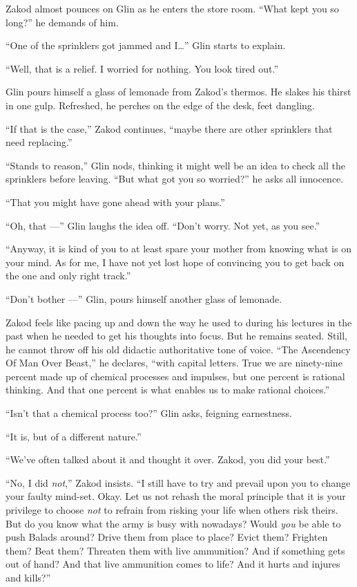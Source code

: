 \documentclass[twoside,11pt,openany]{book}
\begin{document}
Zakod almost pounces on Glin as he enters the store room. ``What kept you so long?'' he
demands of him.

``One of the sprinklers got jammed and I{\ldots}'' Glin starts to explain.

``Well, that is a relief. I worried for nothing. You look tired out.''

Glin pours himself a glass of lemonade from Zakod's thermos. He{ }slakes his
thirst in one gulp. Refreshed, he perches on the edge of the desk, feet dangling.

``If that is the case,'' Zakod continues, ``maybe there are other sprinklers that need replacing.''

``Stands to reason,'' Glin nods, thinking it might well be an idea to check all the sprinklers
before leaving. ``But what got you so worried?'' he asks all innocence.

``That you might have gone ahead with your plans.''

``Oh, that ---'' Glin laughs the idea off. ``Don't worry. Not yet, as you
see.''

``Anyway, it is kind of you to at least spare your mother from knowing what is on your mind. As for me, I
have not yet lost hope of convincing you to get back on the one and only right track.''

``Don't bother ---'' Glin, pours himself another glass of lemonade.

Zakod feels like pacing up and down the way he used to during his lectures in the past when he needed to get his
thoughts into focus. But he remains seated. Still, he cannot throw off his old didactic authoritative tone of voice.
``The Ascendency Of Man Over Beast,'' he declares, ``with capital letters. True we are
ninety-nine percent made up of chemical processes and impulses, but one percent is rational thinking. And that one
percent is what enables us to make rational choices.''

``Isn't that a chemical process too?'' Glin
asks, feigning earnestness.

``It is, but of a different nature.''

``We've often talked about it and thought it over.  Zakod, you did your best.''

``No, I did \textit{not},'' Zakod insists. ``I still have to try and prevail upon
you to change your faulty mind-set. Okay. Let us not rehash the moral principle that it is your privilege to choose
\textit{not} to refrain from risking your life when others risk theirs. But do you know what the army is busy with
nowadays? Would \textit{you} be able to push Balads around? Drive them from place to place? Evict them? Frighten them?
Beat them? Threaten them with live ammunition? And if something gets out of hand? And that live ammunition comes to
life? And it hurts and injures and kills?''
\end{document}
